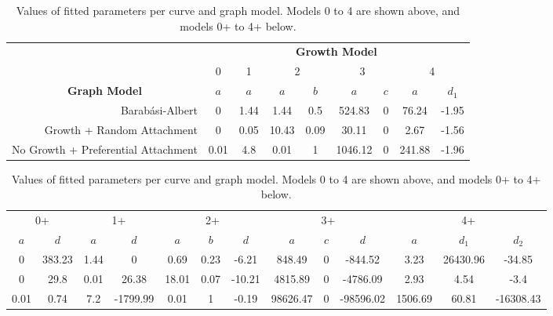 \begin{table}[!htb]
\centering
\begin{tabular}{ccccccccc}
                                                         & \multicolumn{8}{c}{\textbf{Growth Model}}                                           \\ \cline{2-9} 
                                                         & 0    & 1    & \multicolumn{2}{c}{2} & \multicolumn{2}{c}{3} & \multicolumn{2}{c}{4} \\
\textbf{Graph Model}                                     & $a$  & $a$  & $a$        & $b$      & $a$         & $c$     & $a$        & $d_1$    \\ \hline
\multicolumn{1}{r|}{Barabási-Albert}                     & 0    & 1.44 & 1.44       & 0.5      & 524.83      & 0       & 76.24      & -1.95    \\
\multicolumn{1}{r|}{Growth + Random Attachment}          & 0    & 0.05 & 10.43      & 0.09     & 30.11       & 0       & 2.67       & -1.56    \\
\multicolumn{1}{r|}{No Growth + Preferential Attachment} & 0.01 & 4.8  & 0.01       & 1        & 1046.12     & 0       & 241.88     & -1.96   
\end{tabular}

\vspace{1em}

\begin{tabular}{ccccccccccccc}
\multicolumn{2}{c}{0+} & \multicolumn{2}{c}{1+} & \multicolumn{3}{c}{2+} & \multicolumn{3}{c}{3+}     & \multicolumn{3}{c}{4+}         \\
$a$       & $d$        & $a$      & $d$         & $a$    & $b$  & $d$    & $a$      & $c$ & $d$       & $a$     & $d_1$    & $d_2$     \\ \hline
0         & 383.23     & 1.44     & 0           & 0.69   & 0.23 & -6.21  & 848.49   & 0   & -844.52   & 3.23    & 26430.96 & -34.85    \\
0         & 29.8       & 0.01     & 26.38       & 18.01  & 0.07 & -10.21 & 4815.89  & 0   & -4786.09  & 2.93    & 4.54     & -3.4      \\
0.01      & 0.74       & 7.2      & -1799.99    & 0.01   & 1    & -0.19  & 98626.47 & 0   & -98596.02 & 1506.69 & 60.81    & -16308.43
\end{tabular}

\caption{Values of fitted parameters per curve and graph model. Models 0 to 4 are shown above, and models 0+ to 4+ below.} \label{tab:fitted_evol}
\end{table}


